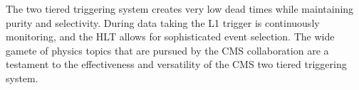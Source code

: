     The two tiered triggering system creates very low dead times while 
      maintaining purity and selectivity.
    During data taking the L1 trigger is continuously monitoring, and the HLT
      allows for sophisticated event selection.
    The wide gamete of physics topics that are pursued by the CMS collaboration
      are a testament to the effectiveness and versatility of the CMS two 
      tiered triggering system. 
